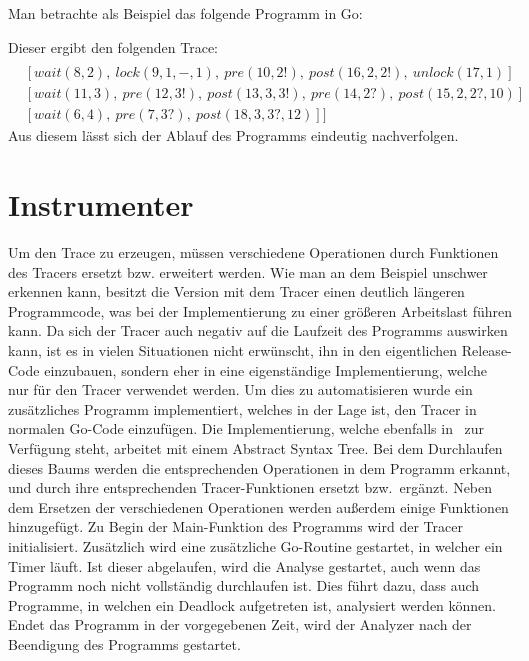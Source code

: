 Man betrachte als Beispiel das folgende Programm in Go:

% 
Dieser ergibt den folgenden Trace:
\begin{align*}
  [&[signal(1, 2),\ signal(2, 3),\ signal(3, 4),\ pre(4, 3?, default),\ post(5, default)]\\
  &[wait(8, 2),\ lock(9, 1, -, 1),\ pre(10, 2!),\ post(16, 2, 2!),\ unlock(17, 1)]\\
  &[wait(11, 3),\ pre(12, 3!),\ post(13, 3, 3!),\ pre(14, 2?),\ post(15, 2, 2?, 10)]\\
  &[wait(6, 4),\ pre(7, 3?),\ post(18, 3, 3?, 12)]]
\end{align*}
Aus diesem lässt sich der Ablauf des Programms
eindeutig nachverfolgen.


\section{Instrumenter}\label{Chap:Tracer-Sec:Instrumenter}
Um den Trace zu erzeugen, müssen verschiedene Operationen durch Funktionen
des Tracers ersetzt bzw. erweitert werden. Wie man an dem Beispiel 
unschwer erkennen kann, besitzt die Version mit dem Tracer einen deutlich längeren
Programmcode, was bei der Implementierung zu einer größeren Arbeitslast 
führen kann. Da sich der Tracer auch negativ auf die Laufzeit des Programms 
auswirken kann, ist es in vielen Situationen nicht erwünscht, ihn in den 
eigentlichen Release-Code einzubauen, sondern eher in eine eigenständige 
Implementierung, welche nur für den Tracer verwendet werden. Um dies zu
automatisieren wurde ein zusätzliches Programm implementiert, welches in der 
Lage ist, den Tracer in normalen Go-Code einzufügen. Die Implementierung, 
welche ebenfalls in~\cite{GoChan} zur Verfügung steht, arbeitet mit einem 
Abstract Syntax Tree. Bei dem Durchlaufen dieses Baums werden die 
entsprechenden Operationen in dem Programm erkannt, und durch ihre entsprechenden 
Tracer-Funktionen ersetzt bzw.\ ergänzt. Neben dem Ersetzen der verschiedenen 
Operationen werden außerdem einige Funktionen hinzugefügt. Zu Begin der 
Main-Funktion des Programms wird der Tracer initialisiert. Zusätzlich
wird eine zusätzliche Go-Routine gestartet, in welcher ein Timer läuft. 
Ist dieser abgelaufen, wird  die Analyse gestartet, 
auch wenn das Programm noch nicht vollständig durchlaufen ist. Dies führt dazu,
dass auch Programme, in welchen ein Deadlock aufgetreten ist, analysiert 
werden können. Endet das Programm in der vorgegebenen Zeit, wird der Analyzer 
nach der Beendigung des Programms gestartet.

